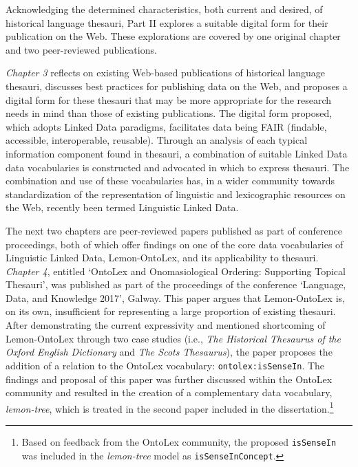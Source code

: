 Acknowledging the determined characteristics, both current and desired, of historical language thesauri, Part II explores a suitable digital form for their publication on the Web. These explorations are covered by one original chapter and two peer-reviewed publications.

\textit{Chapter 3} reflects on existing Web-based publications of historical language thesauri, discusses best practices for publishing data on the Web, and proposes a digital form for these thesauri that may be more appropriate for the research needs in mind than those of existing publications. The digital form proposed, which adopts Linked Data paradigms, facilitates data being FAIR (findable, accessible, interoperable, reusable). Through an analysis of each typical information component found in thesauri, a combination of suitable Linked Data data vocabularies is constructed and advocated in which to express thesauri. The combination and use of these vocabularies has, in a wider community towards standardization of the representation of linguistic and lexicographic resources on the Web, recently been termed Linguistic Linked Data.

The next two chapters are peer-reviewed papers published as part of conference proceedings, both of which offer findings on one of the core data vocabularies of Linguistic Linked Data, Lemon-OntoLex, and its applicability to thesauri. \textit{Chapter 4}, entitled `OntoLex and Onomasiological Ordering: Supporting Topical Thesauri', was published as part of the proceedings of the conference `Language, Data, and Knowledge 2017', Galway. This paper argues that Lemon-OntoLex is, on its own, insufficient for representing a large proportion of existing thesauri. After demonstrating the current expressivity and mentioned shortcoming of Lemon-OntoLex through two case studies (i.e., \textit{The Historical Thesaurus of the Oxford English Dictionary} and \textit{The Scots Thesaurus}), the paper proposes the addition of a relation to the OntoLex vocabulary: \texttt{ontolex:isSenseIn}. The findings and proposal of this paper was further discussed within the OntoLex community and resulted in the creation of a complementary data vocabulary, \textit{lemon-tree}, which is treated in the second paper included in the dissertation.\footnote{Based on feedback from the OntoLex community, the proposed \texttt{isSenseIn} was included in the \textit{lemon-tree} model as \texttt{isSenseInConcept}.}


